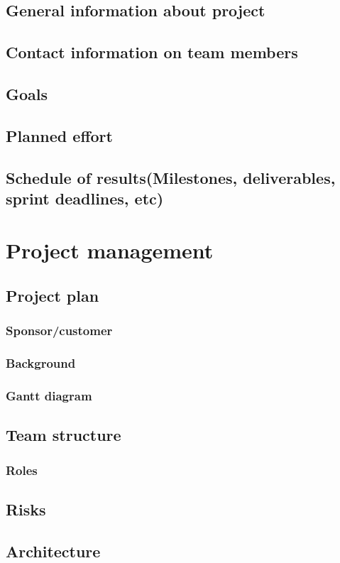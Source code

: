 \documentclass[10pt,a4paper,oneside]{report}
\begin{document}
\section{General information about project}
\section{Contact information on team members}
\section{Goals}
\section{Planned effort}
\section{Schedule of results(Milestones, deliverables, sprint deadlines, etc)}


\chapter{Project management}
\section{Project plan}
\subsection{Sponsor/customer}
\subsection{Background}
\subsection{Gantt diagram}
\section{Team structure}
\subsection{Roles}
\section{Risks}
\section{Architecture}
\end{document}
